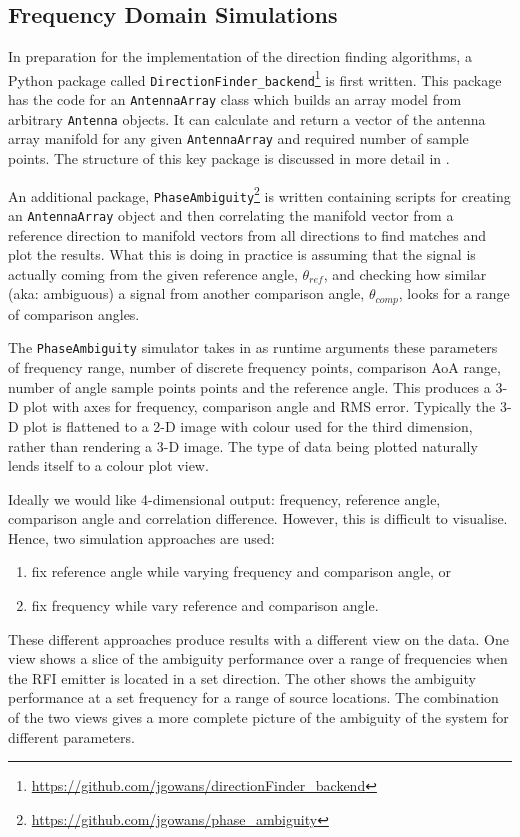\subsection{Frequency Domain Simulations}
In preparation for the implementation of the direction finding algorithms, a Python package called \lstinline{DirectionFinder_backend}\footnote{\url{https://github.com/jgowans/directionFinder\_backend}} is first written. This package has the code for an \lstinline{AntennaArray} class which builds an array model from arbitrary \lstinline{Antenna} objects. It can calculate and return a vector of the antenna array manifold for any given \lstinline{AntennaArray} and required number of sample points. The structure of this key package is discussed in more detail in .

An additional package, \lstinline{PhaseAmbiguity}\footnote{\url{https://github.com/jgowans/phase\_ambiguity}} is written containing scripts for creating an \lstinline{AntennaArray} object and then correlating the manifold vector from a reference direction to manifold vectors from all directions to find matches and plot the results. What this is doing in practice is assuming that the signal is actually coming from the given reference angle, \(\theta_{ref}\), and checking how similar (aka: ambiguous) a signal from another comparison angle, \(\theta_{comp}\), looks for a range of comparison angles.

The \lstinline{PhaseAmbiguity} simulator takes in as runtime arguments these parameters of frequency range, number of discrete frequency points, comparison AoA range, number of angle sample points points and the reference angle.
This produces a 3-D plot with axes for frequency, comparison angle and RMS error. Typically the 3-D plot is flattened to a 2-D image with colour used for the third dimension, rather than rendering a 3-D image. The type of data being plotted naturally lends itself to a colour plot view.

Ideally we would like 4-dimensional output: frequency, reference angle, comparison angle and correlation difference. However, this is difficult to visualise. Hence, two simulation approaches are used:
\begin{enumerate}
  \item fix reference angle while varying frequency and comparison angle, or
  \item fix frequency while vary reference and comparison angle.
\end{enumerate}
These different approaches produce results with a different view on the data. One view shows a slice of the ambiguity performance over a range of frequencies when the RFI emitter is located in a set direction. The other shows the ambiguity performance at a set frequency for a range of source locations. The combination of the two views gives a more complete picture of the ambiguity of the system for different parameters.

